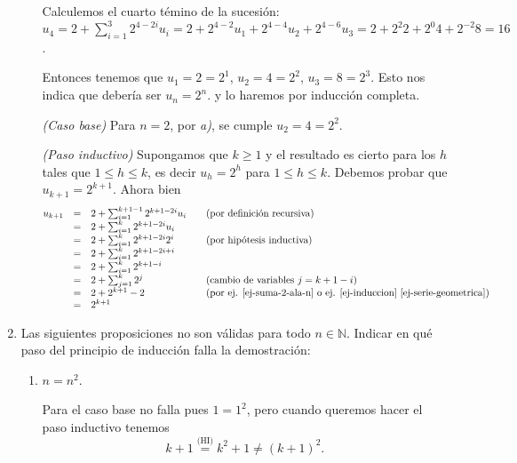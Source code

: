 \begin{enumerate}
\begin{enumerate}
        \rta Calculemos el cuarto témino de la sucesión: $u_4 =  2+\sum_{i=1}^{3}2^{4-2i}u_i = 2+2^{4-2}u_1 + 2^{4-4}u_2 + 2^{4-6}u_3= 2+2^2 2 + 2^{0}4 + 2^   {-2}8 = 16$. 
        
        Entonces tenemos que $u_1 = 2 = 2^1$, $u_2 = 4 = 2^2$, $u_3 = 8 = 2^3$. Esto nos indica que debería ser $u_n = 2^n$.  y lo haremos por inducción completa. 
        
        \textit{(Caso base)} Para $n=2$, por \textit{a)}, se cumple $u_2 = 4 =2^2$. 
        
        \textit{(Paso inductivo)} Supongamos que $k \ge 1$ y el resultado  es cierto para los $h$ tales que  $1 \le h \le k$,  es decir $u_h=2^h$ para $1 \le h \le k$. Debemos probar que $u_{k+1} = 2^{k+1}$. Ahora bien
        \begin{equation*}
        \begin{matrix*}[l]
        u_{k+1} &=& 2+\sum_{i=1}^{k+1-1}2^{k+1-2i}u_i \hfill &\quad \text{(por definición recursiva)} \hfill \\
        &=& 2+\sum_{i=1}^{k}2^{k+1-2i}u_i \hfill &\hfill\\
        &=& 2+\sum_{i=1}^{k}2^{k+1-2i}2^i \hfill &\quad \text{(por hipótesis inductiva)}\hfill \\
        &=& 2+\sum_{i=1}^{k}2^{k+1-2i+ i} \hfill  & \hfill\\
        &=& 2+\sum_{i=1}^{k}2^{k+1-i} \hfill  & \hfill\\
        &=& 2+\sum_{j=1}^{k}2^{j} \hfill  &\quad \text{(cambio de variables $j =k +1-i$)}\hfill \\
        &=& 2+2^{k+1} -2 \hfill  &\quad \text{(por ej. \ref{ej-suma-2-ala-n} o ej. \ref{ej-induccion} \ref{ej-serie-geometrica})}\hfill \\
        &=& 2^{k+1} \hfill  &\quad \hfill
        \end{matrix*}
        \end{equation*} 
    \end{enumerate}
    

    \item Las siguientes proposiciones no son válidas para todo $n \in {\mathbb N}$. Indicar en qué paso del principio de inducción falla la demostración:
        \begin{enumerate}
            \item  $n=n^2$.
            
            \rta Para el caso base no falla pues $1 = 1^2$,  pero cuando queremos hacer el paso inductivo tenemos
            \begin{equation*}
                k+1 \overset{\text{(HI)}}{=} k^2 +1 \not=(k+1)^2.
            \end{equation*}
            

\end{enumerate}
\end{enumerate}
